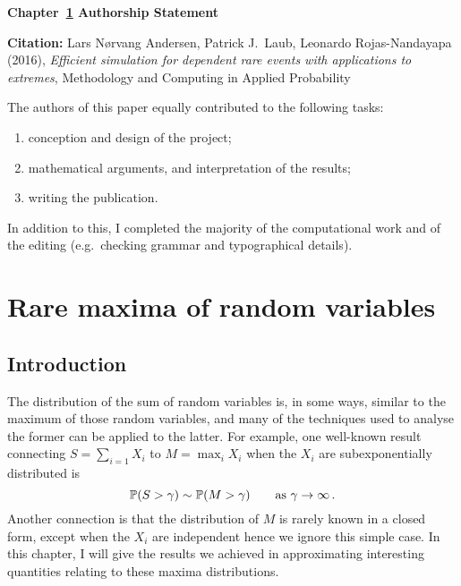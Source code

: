 \vspace*{\fill}

{\large \bf Chapter~\ref{chp:maxima} Authorship Statement}

\vspace{1em}

{\bf Citation:} Lars N{\o}rvang Andersen, Patrick J.\ Laub, Leonardo Rojas-Nandayapa (2016), \emph{Efficient simulation for dependent rare events with applications to extremes}, Methodology and Computing in Applied Probability

\vspace{1em}

The authors of this paper equally contributed to the following tasks:
\begin{enumerate}
\item conception and design of the project;
\item mathematical arguments, and interpretation of the results;
\item writing the publication.
\end{enumerate}

In addition to this, I completed the majority of the computational work and of the editing (e.g.\ checking grammar and typographical details).

\vspace{3em}

\vspace*{\fill}

\chapter{Rare maxima of random variables} \label{chp:maxima}


\section{Introduction}

The distribution of the sum of random variables is, in some ways, similar to the maximum of those random variables, and many of the techniques used to analyse the former can be applied to the latter. For example, one well-known result connecting $S = \sum_{i=1} X_i$ to $M = \max_i X_i$ when the $X_i$ are subexponentially distributed is
\[ \operatorname{{\mathbb P}}(S > \gamma) \sim \operatorname{{\mathbb P}}(M > \gamma) \qquad \text{as } \gamma \to \infty\,. \]
Another connection is that the distribution of $M$ is rarely known in a closed form, except when the $X_i$ are independent hence we ignore this simple case. In this chapter, I will give the results we achieved in approximating interesting quantities relating to these maxima distributions.

